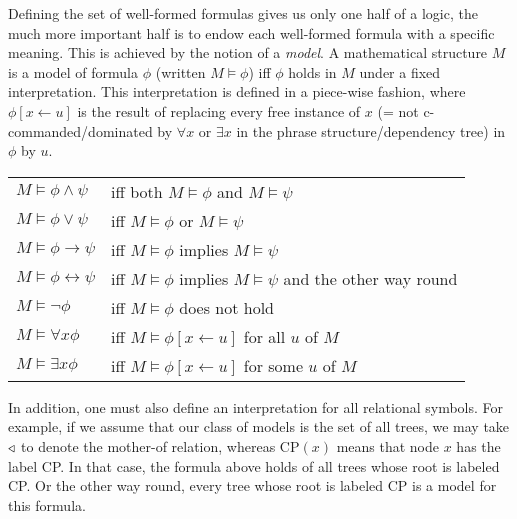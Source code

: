 Defining the set of well-formed formulas gives us only one half of a logic, the much more important half is to endow each well-formed formula with a specific meaning.
This is achieved by the notion of a \emph{model}.
A mathematical structure $M$ is a model of formula $\phi$ (written $M \models \phi$) iff $\phi$ holds in $M$ under a fixed interpretation.
This interpretation is defined in a piece-wise fashion, where $\phi[x \leftarrow u]$ is the result of replacing every free instance of $x$ (= not c-commanded\slash dominated by $\forall x$ or $\exists x$ in the phrase structure\slash dependency tree) in $\phi$ by $u$.
%
\begin{center}
    \begin{tabular}{ll}
        $M \models \phi \wedge \psi$          & iff both $M \models \phi$ and $M \models \psi$\\
        $M \models \phi \vee \psi$            & iff $M \models \phi$ or $M \models \psi$\\
        $M \models \phi \rightarrow \psi$     & iff $M \models \phi$ implies $M \models \psi$\\
        $M \models \phi \leftrightarrow \psi$ & iff $M \models \phi$ implies $M \models \psi$ and the other way round\\
        $M \models \neg \phi$                 & iff $M \models \phi$ does not hold\\
        $M \models \forall x \phi$            & iff $M \models \phi[x \leftarrow u]$ for all $u$ of $M$\\
        $M \models \exists x \phi$            & iff $M \models \phi[x \leftarrow u]$ for some $u$ of $M$\\
    \end{tabular}
\end{center}
%
In addition, one must also define an interpretation for all relational symbols.
For example, if we assume that our class of models is the set of all trees, we may take $\triangleleft$ to denote the mother-of relation, whereas $\mathrm{CP}(x)$ means that node $x$ has the label CP\@.
In that case, the formula above holds of all trees whose root is labeled CP\@.
Or the other way round, every tree whose root is labeled CP is a model for this formula.

